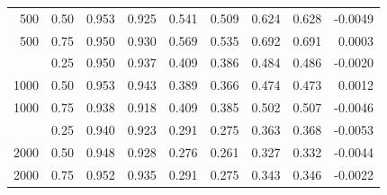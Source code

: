 \begin{table}[t]
\begin{tabular}{rr rr rr rr r}
500 & 0.50 & 0.953 & 0.925 & 0.541 & 0.509 & 0.624 & 0.628 & -0.0049 \\
500 & 0.75 & 0.950 & 0.930 & 0.569 & 0.535 & 0.692 & 0.691 & 0.0003 \\
\addlinespace
1000 & 0.25 & 0.950 & 0.937 & 0.409 & 0.386 & 0.484 & 0.486 & -0.0020 \\
1000 & 0.50 & 0.953 & 0.943 & 0.389 & 0.366 & 0.474 & 0.473 & 0.0012 \\
1000 & 0.75 & 0.938 & 0.918 & 0.409 & 0.385 & 0.502 & 0.507 & -0.0046 \\
\addlinespace
2000 & 0.25 & 0.940 & 0.923 & 0.291 & 0.275 & 0.363 & 0.368 & -0.0053 \\
2000 & 0.50 & 0.948 & 0.928 & 0.276 & 0.261 & 0.327 & 0.332 & -0.0044 \\
2000 & 0.75 & 0.952 & 0.935 & 0.291 & 0.275 & 0.343 & 0.346 & -0.0022 \\
\bottomrule\end{tabular}\end{table}
